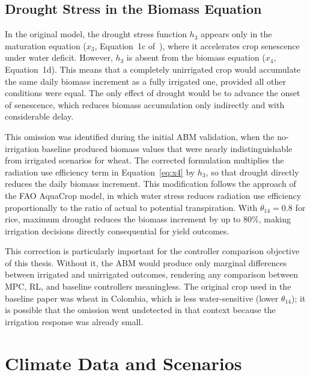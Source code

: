 \subsection{Drought Stress in the Biomass Equation}
\label{sec:h3_correction}

In the original model, the drought stress function $h_3$ appears only in the maturation equation ($x_3$, Equation~1c of~\cite{Lopezjimenez2024}), where it accelerates crop senescence under water deficit. However, $h_3$ is absent from the biomass equation ($x_4$, Equation~1d). This means that a completely unirrigated crop would accumulate the same daily biomass increment as a fully irrigated one, provided all other conditions were equal. The only effect of drought would be to advance the onset of senescence, which reduces biomass accumulation only indirectly and with considerable delay.

This omission was identified during the initial ABM validation, when the no-irrigation baseline produced biomass values that were nearly indistinguishable from irrigated scenarios for wheat. The corrected formulation multiplies the radiation use efficiency term in Equation~\eqref{eq:x4} by $h_3$, so that drought directly reduces the daily biomass increment. This modification follows the approach of the FAO AquaCrop model, in which water stress reduces radiation use efficiency proportionally to the ratio of actual to potential transpiration. With $\theta_{14} = 0.8$ for rice, maximum drought reduces the biomass increment by up to 80\%, making irrigation decisions directly consequential for yield outcomes.

This correction is particularly important for the controller comparison objective of this thesis. Without it, the ABM would produce only marginal differences between irrigated and unirrigated outcomes, rendering any comparison between MPC, RL, and baseline controllers meaningless. The original crop used in the baseline paper was wheat in Colombia, which is less water-sensitive (lower $\theta_{14}$); it is possible that the omission went undetected in that context because the irrigation response was already small.


\section{Climate Data and Scenarios}
\label{sec:climate}


